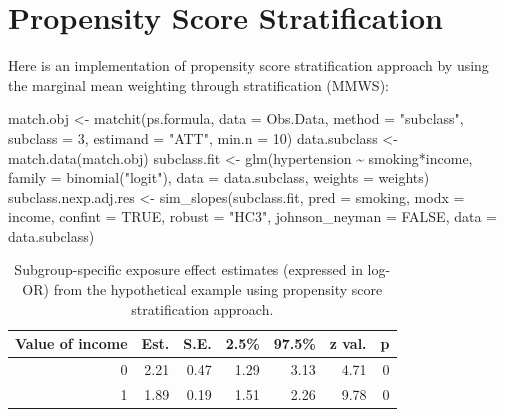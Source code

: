 \documentclass[
  letterpaper,
  DIV=11,
  numbers=noendperiod]{scrreprt}
\newenvironment{Shaded}{\begin{snugshade}}{\end{snugshade}}
\newcommand{\AttributeTok}[1]{\textcolor[rgb]{0.40,0.45,0.13}{#1}}
\newcommand{\ConstantTok}[1]{\textcolor[rgb]{0.56,0.35,0.01}{#1}}
\newcommand{\DecValTok}[1]{\textcolor[rgb]{0.68,0.00,0.00}{#1}}
\newcommand{\FunctionTok}[1]{\textcolor[rgb]{0.28,0.35,0.67}{#1}}
\newcommand{\NormalTok}[1]{\textcolor[rgb]{0.00,0.23,0.31}{#1}}
\newcommand{\OtherTok}[1]{\textcolor[rgb]{0.00,0.23,0.31}{#1}}
\newcommand{\SpecialCharTok}[1]{\textcolor[rgb]{0.37,0.37,0.37}{#1}}
\newcommand{\StringTok}[1]{\textcolor[rgb]{0.13,0.47,0.30}{#1}}
\begin{document}
\hypertarget{propensity-score-stratification-1}{%
\section{Propensity Score
Stratification}\label{propensity-score-stratification-1}}

Here is an implementation of propensity score stratification approach by
using the marginal mean weighting through stratification (MMWS):

\begin{Shaded}
\begin{Highlighting}[]
\NormalTok{match.obj }\OtherTok{\textless{}{-}} \FunctionTok{matchit}\NormalTok{(ps.formula, }\AttributeTok{data =}\NormalTok{ Obs.Data,}
                      \AttributeTok{method =} \StringTok{"subclass"}\NormalTok{, }\AttributeTok{subclass =} \DecValTok{3}\NormalTok{, }
                      \AttributeTok{estimand =} \StringTok{"ATT"}\NormalTok{, }\AttributeTok{min.n =} \DecValTok{10}\NormalTok{)}
\NormalTok{data.subclass }\OtherTok{\textless{}{-}} \FunctionTok{match.data}\NormalTok{(match.obj)}
\NormalTok{subclass.fit }\OtherTok{\textless{}{-}} \FunctionTok{glm}\NormalTok{(hypertension }\SpecialCharTok{\textasciitilde{}}\NormalTok{ smoking}\SpecialCharTok{*}\NormalTok{income, }\AttributeTok{family =} \FunctionTok{binomial}\NormalTok{(}\StringTok{"logit"}\NormalTok{),}
              \AttributeTok{data =}\NormalTok{ data.subclass,}
              \AttributeTok{weights =}\NormalTok{ weights)}
\NormalTok{subclass.nexp.adj.res }\OtherTok{\textless{}{-}} \FunctionTok{sim\_slopes}\NormalTok{(subclass.fit, }
                                    \AttributeTok{pred =}\NormalTok{ smoking, }
                                    \AttributeTok{modx =}\NormalTok{ income, }
                                    \AttributeTok{confint =} \ConstantTok{TRUE}\NormalTok{,}
                                    \AttributeTok{robust =} \StringTok{"HC3"}\NormalTok{,}
                                    \AttributeTok{johnson\_neyman =} \ConstantTok{FALSE}\NormalTok{,}
                                    \AttributeTok{data =}\NormalTok{ data.subclass)}
\end{Highlighting}
\end{Shaded}

\hypertarget{tbl-s-mmws}{}
\begin{table}[!h]
\caption{\label{tbl-s-mmws}Subgroup-specific exposure effect estimates (expressed in log-OR) from
the hypothetical example using propensity score stratification approach. }\tabularnewline

\centering
\begin{tabular}{rrrrrrr}
\toprule
Value of income & Est. & S.E. & 2.5\% & 97.5\% & z val. & p\\
\midrule
0 & 2.21 & 0.47 & 1.29 & 3.13 & 4.71 & 0\\
1 & 1.89 & 0.19 & 1.51 & 2.26 & 9.78 & 0\\
\bottomrule
\end{tabular}
\end{table}
\end{document}
